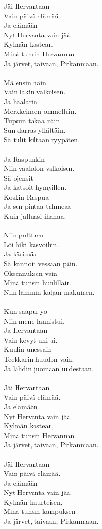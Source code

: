 
Jäi Hervantaan \\ Vain päivä elämää. \\ Ja elämään \\ Nyt Hervanta vain jää. \\ Kylmän kostean, \\ Minä tunsin Hervannan \\ Ja järvet, taivaan, Pirkanmaan. \\ \hspace{10mm} \\ Mä ensin näin \\ Vain lakin valkoisen. \\ Ja haalarin \\ Merkkeineen ommelluin. \\ Tupsun takaa näin \\ Sun darras yllättäin. \\ Sä tulit kiltaan ryypäten. \\ \hspace{10mm} \\ Ja Raspunkin \\ Niin vaahdon valkoisen. \\ Sä ojensit \\ Ja katsoit hymyillen. \\ Koskin Raspua \\ Ja sen pintaa tahmeaa \\ Kuin jalluasi ihanaa. \\ \hspace{10mm} \\ Niin polttaen \\ Löi hiki kasvoihin. \\ Ja käsissäs \\ Sä kannoit vessaan päin. \\ Oksennuksen vain \\ Minä tunsin huulillain. \\ Niin lämmin kaljan makuinen. \\ \hspace{10mm} \\ Kun saapui yö \\ Niin meno lannistui. \\ Ja Hervantaan \\ Vain kevyt uni ui. \\ Kuulin unessain \\ Teekkarin huudon vain. \\ Ja lähdin juomaan uudestaan. \\ \hspace{10mm} \\ Jäi Hervantaan \\ Vain päivä elämää. \\ Ja elämään \\ Nyt Hervanta vain jää. \\ Kylmän kostean, \\ Minä tunsin Hervannan \\ Ja järvet, taivaan, Pirkanmaan. \\ \hspace{10mm} \\ Jäi Hervantaan \\ Vain päivä elämää. \\ Ja elämään \\ Nyt Hervanta vain jää. \\ Kylmän huurteisen, \\ Minä tunsin kampuksen \\ Ja järvet, taivaan, Pirkanmaan.